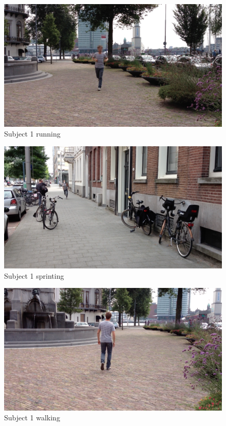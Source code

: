 \begin{figure}
\centering
  \includegraphics[width=1\textwidth]{./Figures/chapter6/data_collection/stills/jos_run.png}
  \caption[Recording still 3]{Subject 1 running}
  \label{fig:data_gathering_still_1_running_2}
\end{figure}

\begin{figure}
\centering
  \includegraphics[width=1\textwidth]{./Figures/chapter6/data_collection/stills/jos_sprint.png}
  \caption[Recording still 4]{Subject 1 sprinting}
  \label{fig:data_gathering_still_1_sprint}
\end{figure}

\begin{figure}
\centering
  \includegraphics[width=1\textwidth]{./Figures/chapter6/data_collection/stills/jos_walking.png}
  \caption[Recording still 5]{Subject 1 walking}
  \label{fig:data_gathering_still_1_walk}
\end{figure}

